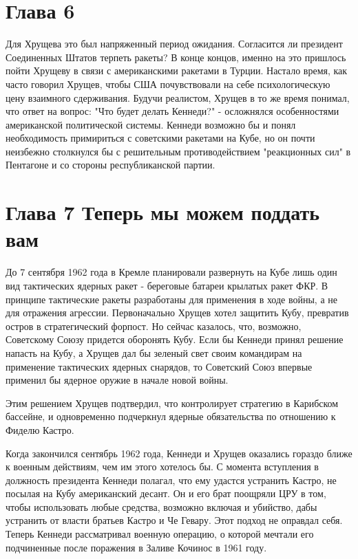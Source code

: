 \documentclass[14pt]{extreport}
\begin{document}
\section{Глава 6}

Для Хрущева это был напряженный период ожидания. Согласится ли президент Соединенных Штатов терпеть ракеты? В конце концов, именно на это пришлось пойти Хрущеву в связи с американскими ракетами в Турции. Настало время, как часто говорил Хрущев, чтобы США почувствовали на себе психологическую цену взаимного сдерживания. Будучи реалистом, Хрущев в то же время понимал, что ответ на вопрос: "Что будет делать Кеннеди?" - осложнялся особенностями американской политической системы. Кеннеди возможно бы и понял необходимость примириться с советскими ракетами на Кубе, но он почти неизбежно столкнулся бы с решительным противодействием "реакционных сил" в Пентагоне и со стороны республиканской партии. 


\section{Глава 7 Теперь мы можем поддать вам}

До 7 сентября 1962 года в Кремле планировали развернуть на Кубе лишь один вид тактических ядерных ракет - береговые батареи крылатых ракет ФКР. В принципе тактические ракеты разработаны для применения в ходе войны, а не для отражения агрессии. Первоначально Хрущев хотел защитить Кубу, превратив остров в стратегический форпост. Но сейчас казалось, что, возможно, Советскому Союзу придется оборонять Кубу. 
Если бы Кеннеди принял решение напасть на Кубу, а Хрущев дал бы зеленый свет своим командирам на применение тактических ядерных снарядов, то Советский Союз впервые применил бы ядерное оружие в начале новой войны.

Этим решением Хрущев подтвердил, что контролирует стратегию в Карибском бассейне, и одновременно подчеркнул ядерные обязательства по отношению к Фиделю Кастро. 

Когда закончился сентябрь 1962 года, Кеннеди и Хрущев оказались гораздо ближе к военным действиям, чем им этого хотелось бы. С момента вступления в должность президента Кеннеди полагал, что ему удастся устранить Кастро, не посылая на Кубу американский десант. Он и его брат поощряли ЦРУ в том, чтобы использовать любые средства, возможно включая и убийство, дабы устранить от власти братьев Кастро и Че Гевару. Этот подход не оправдал себя. Теперь Кеннеди рассматривал военную операцию, о которой мечтали его подчиненные после поражения в Заливе Кочинос в 1961 году.
\end{document}
